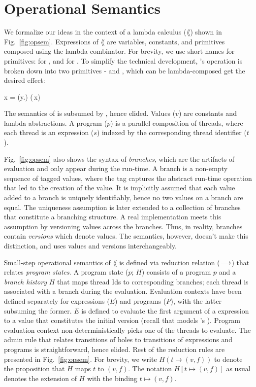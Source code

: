 \section{Operational Semantics}



We formalize our ideas in the context of a lambda calculus ($\lang$)
shown in Fig.~\ref{fig:opsem}. Expressions of $\lang$ are variables,
constants, and \name primitives composed using the lambda combinator.
For brevity, we use short names for \name primitives:  for
, and  for . To
simplify the technical development, \name's 
operation is broken down into two primitives -  and ,
which can be lambda-composed get the desired effect:
\begin{smathpar}
  \;x \;=\; (\lambda y.\pull)\; (\push\,x)
\end{smathpar}
The semantics of is subsumed by ,
hence elided.  Values ($v$) are constants and lambda abstractions.  A
program ($p$) is a parallel composition of threads, where each thread
is an expression ($s$) indexed by the corresponding thread identifier
($t$). 

Fig.~\ref{fig:opsem} also shows the syntax of \emph{branches}, which
are the artifacts of evaluation and only appear during the run-time. A
branch is a non-empty sequence of tagged values, where the tag
captures the abstract run-time operation that led to the creation of
the value. It is implicitly assumed that each value added to a branch
is uniquely identifiably, hence no two values on a branch are equal.
The uniqueness assumption is later extended to a collection of
branches that constitute a branching structure. A real implementation
meets this assumption by versioning values across the branches. Thus,
in reality, branches contain \emph{versions} which denote values. The
semantics, however, doesn't make this distinction, and uses values and
versions interchangeably.

Small-step operational semantics of $\lang$ is defined via reduction
relation ($\longrightarrow$) that relates \emph{program states}. A program
state ($p;\,H$) consists of a program $p$ and a \emph{branch history}
$H$ that maps thread Ids to corresponding branches; each thread is
associated with a branch during the evaluation. Evaluation contexts
have been defined separately for expressions ($E$) and programs ($P$),
with the latter subsuming the former. $E$ is defined to evaluate the
first argument of a  expression to a value that constitutes the
initial version (recall that  models \name's
). Program evaluation context
non-deterministically picks one of the threads to evaluate. The admin
rule that relates transitions of holes to transitions of expressions
and programs is straightforward, hence elided. Rest of the reduction
rules are presented in Fig.~\ref{fig:opsem}. For brevity, we write
$H(t\mapsto (v,f))$ to denote the proposition that $H$ maps $t$ to
$(v,f)$. The notation $H[t \mapsto (v,f)]$ as usual denotes
the extension of $H$ with the binding $t \mapsto (v,f)$.

